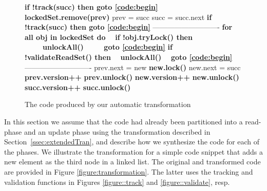 \begin{figure*}
\begin{center}
\begin{subfigure}[t]{.45\textwidth}
\begin{algorithmic}[1]{}
{			\State{\spOne}\textbf{if !track(succ) then {goto} \ref{code:begin}}  \label{code:readGhaseGoto2}
			\State{\spOne}\textbf{lockedSet.remove(prev)} \label{code:lockedSet:remove2}
			\State{\spOne}prev = succ
			\State{\spOne}succ = succ.next
			\State{\spZero}\textbf{if !track(succ) then {goto} \ref{code:begin}} \label{code:readGhaseGoto3}
			\Statex ----------------------------
			\State{\spZero}\textbf{for all obj in lockedSet do} \label{code:validateLockedSet}	
            \State{\spZero}\ \ \textbf{if !obj.tryLock() then}
            \State{\spZero}\ \ \ \ \ \textbf{unlockAll()}
            \State{\spZero}\ \ \ \ \ \textbf{{goto} \ref{code:begin}} \label{code:validateGoto1}
			\State{\spZero}\textbf{if !validateReadSet() then} 		\label{code:validateReadSet}
				\State{\spZero}\ \ \textbf{unlockAll()}
				\State{\spZero}\ \ \textbf{{goto} \ref{code:begin}} \label{code:validateGoto2}
			\Statex ----------------------------
			\State{\spZero}prev.next = new
			\State{\spZero}\textbf{new.lock()}
			\State{\spZero}new.next = succ			
			\State{\spZero}\textbf{prev.version++}
			\State{\spZero}\textbf{prev.unlock()}
			\State{\spZero}\textbf{new.version++}
			\State{\spZero}\textbf{new.unlock()}
			\State{\spZero}\textbf{succ.version++}
			\State{\spZero}\textbf{succ.unlock()}

			\EndFunction
			}
		\end{algorithmic}
		\caption{The code produced by our automatic transformation}\label{figure:transformation:after}
	\end{subfigure}
	\end{center}
\vspace{-4mm}
	\caption{Code example.
	The synchronization code is in bold.
			\label{figure:transformation}}
\end{figure*}

In this section we assume that the code had already been partitioned into a read-phase and an update phase using
the transformation described in Section~\ref{ssec:extendedTran}, and
describe how we synthesize the code for each of the phases.
We illustrate the transformation for a simple code snippet that adds a new element as the third node in a linked list.
The original and transformed code are provided in Figure \ref{figure:transformation}. The latter uses
the tracking and validation functions in Figures \ref{figure::track} and
\ref{figure::validate}, resp.

